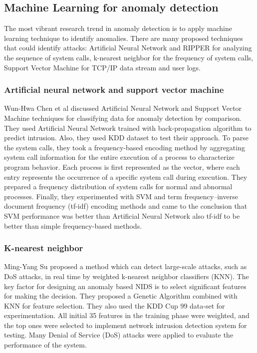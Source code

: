 \documentclass [11pt]{article}
\begin{document}
\subsection{Machine Learning for anomaly detection}
The most vibrant research trend in anomaly detection is to apply machine learning technique to identify anomalies. There are many proposed techniques that could identify attacks: Artificial Neural Network and RIPPER for analyzing the sequence of system calls, k-nearest neighbor for the frequency of system calls, Support Vector Machine for TCP/IP data stream and user logs.

\subsubsection*{Artificial neural network and support vector machine}
Wun-Hwa Chen et al \cite{chen2005application} discussed Artificial Neural Network and Support Vector Machine techniques for classifying data for anomaly detection by comparison. They used Artificial Neural Network trained with back-propagation algorithm to predict intrusion. Also, they used KDD dataset to test their approach. To parse the system calls, they took a frequency-based encoding method by aggregating system call information for the entire execution of a process to characterize program behavior. Each process is first represented as the vector, where each entry represents the occurrence of a specific system call during execution. They prepared a frequency distribution of system calls for normal and abnormal processes. Finally, they experimented with SVM and term frequency–inverse document frequency (tf-idf) encoding methods and came to the conclusion that SVM performance was better than Artificial Neural Network also tf-idf to be better than simple frequency-based methods.

\subsubsection*{K-nearest neighbor}
Ming-Yang Su \cite{DBLP:journals/eswa/Su11} proposed a method which can detect large-scale
attacks, such as DoS attacks, in real time by weighted k-nearest neighbor classifiers (KNN). The key factor for designing an anomaly based NIDS is to select significant features for making the decision. They proposed a Genetic Algorithm combined with KNN for feature
selection. They also used the KDD Cup 99 data-set for experimentation. All initial 35
features in the training phase were weighted, and the top ones were selected to
implement network intrusion detection system for testing. Many Denial of Service (DoS) attacks were applied to evaluate the performance of the system.
\end{document}
